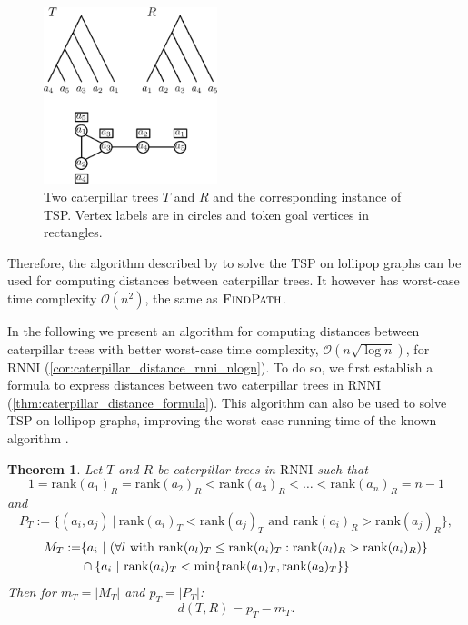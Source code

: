 \documentclass[11pt]{amsart}
\newtheorem{theorem}{Theorem}
\newcommand{\rnni}{\mathrm{RNNI}}
\newcommand{\findpath}{\textsc{FindPath}}
\newcommand{\rank}{\mathrm{rank}}
\renewcommand{\O}{\mathcal O}
\begin{document}
\begin{figure}[ht]
	\includegraphics[width=0.45\textwidth]{tsp_caterpillar.eps}
	\caption{Two caterpillar trees $T$ and $R$ and the corresponding instance of TSP.
	Vertex labels are in circles and token goal vertices in rectangles.}
	\label{fig:tsp_caterpillar}
\end{figure}

Therefore, the algorithm described by \textcite{Kawahara2017-ey} to solve the TSP on lollipop graphs can be used for computing distances between caterpillar trees.
It however has worst-case time complexity $\O(n^2)$, the same as $\findpath$.

In the following we present an algorithm for computing distances between caterpillar trees with better worst-case time complexity, $\O(n \sqrt{\log n})$, for $\rnni$ (\autoref{cor:caterpillar_distance_rnni_nlogn}).
To do so, we first establish a formula to express distances between two caterpillar trees in $\rnni$ (\autoref{thm:caterpillar_distance_formula}).
This algorithm can also be used to solve TSP on lollipop graphs, improving the worst-case running time of the known algorithm \autocite{Kawahara2017-ey}.

\begin{theorem}
	Let $T$ and $R$ be caterpillar trees in $\rnni$ such that \[1 = \rank(a_1)_R = \rank(a_2)_R < \rank(a_3)_R < \ldots < \rank(a_n)_R = n-1\]
	and
	\[P_T := \{(a_i,a_j)\ |\  \rank(a_i)_T < \rank(a_j)_T \text{ and } \rank(a_i)_R > \rank(a_j)_R\},\]
	\begin{align*}
		M_T := &\{a_i\ |\  (\forall l \textnormal{ with } \rank(a_l)_T \leq \rank(a_i)_T: \rank(a_l)_R > \rank(a_i)_R)\} \\
		& \cap \{a_i \ |\  \rank(a_i)_T < \min\{\rank(a_1)_T, \rank(a_2)_T\}\}
	\end{align*}
	Then for ${m_T = |M_T|}$ and ${p_T = |P_T|}$:
	\[d(T,R) = p_T - m_T.\]
	\label{thm:caterpillar_distance_formula}
\end{theorem}
\end{document}
